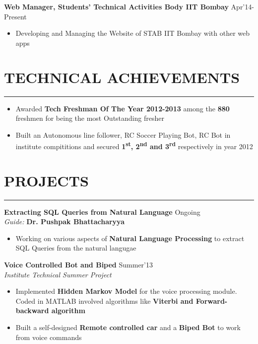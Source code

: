\documentclass[11pt]{article} %
\begin{document}
\noindent \textbf{Web Manager, Students' Technical Activities Body IIT Bombay} \hfill Apr'14-Present
\vspace{-3mm}
\begin{itemize}
\itemsep-0.3em
\item Developing and Managing the Website of STAB IIT Bombay with other web apps 
\end{itemize}
\vspace{-7mm}

\section*{TECHNICAL ACHIEVEMENTS}
\hrule
\medskip

\begin{itemize}
\itemsep-0.3em
\item Awarded {\bf Tech Freshman Of The Year 2012-2013} among the {\bf 880} freshmen for being the most Outstanding fresher
\item Built an Autonomous line follower, RC Soccer Playing Bot, RC Bot in institute compititions and secured {\bf 1\textsuperscript{st}, 2\textsuperscript{nd} and 3\textsuperscript{rd} } respectively in year 2012
\end{itemize}
\vspace{-7mm}

\section*{PROJECTS}
\hrule
\medskip

\noindent \textbf{Extracting SQL Queries from Natural Language} \hfill Ongoing\\
\textit{Guide:} \textbf{Dr. Pushpak Bhattacharyya}
\vspace{-3mm}
\begin{itemize}
\itemsep-0.3em
\item Working on various aspects of \textbf{Natural Language Processing} to extract SQL Queries from the natural langugae

\end{itemize}
\vspace{-1mm}


\noindent \textbf{Voice Controlled Bot and Biped} \hfill Summer'13\\
\textit{Institute Technical Summer Project}
\vspace{-2mm}
\begin{itemize}
\itemsep-0.3em
\item Implemented \textbf{Hidden Markov Model} for the voice processing module. Coded in
MATLAB involved algorithms like \textbf{Viterbi and Forward-backward algorithm}
\item Built a self-designed \textbf{Remote controlled car} and a \textbf{Biped Bot} to work from voice commands

\end{itemize}
\vspace{-1mm}
\end{document}
